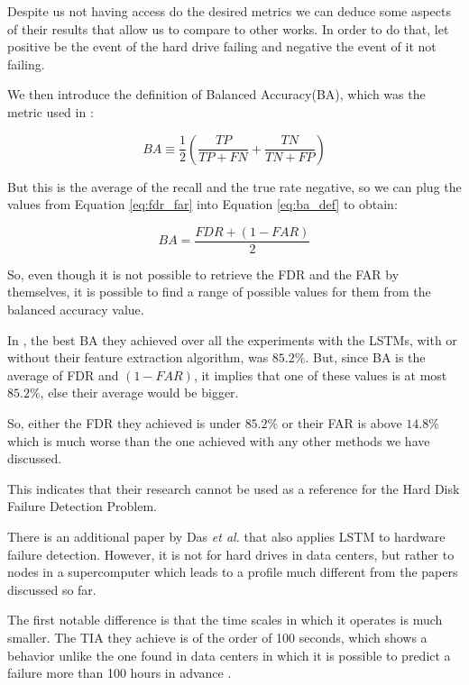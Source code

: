 Despite us not having access do the desired metrics we can deduce some aspects of their results that allow us to compare to other works.
In order to do that, let positive be the event of the hard drive failing and negative the event of it not failing.

We then introduce the definition of Balanced Accuracy(BA), which was the metric used in \cite{zhang2017deep}:

\begin{equation}\label{eq:ba_def}
    BA \equiv \dfrac{1}{2}\left(\dfrac{TP}{TP + FN} + \dfrac{TN}{TN + FP}\right)
\end{equation}

But this is the average of the recall and the true rate negative, so we can plug the values from Equation \ref{eq:fdr_far} into Equation \ref{eq:ba_def} to obtain:

\begin{equation}
    BA = \dfrac{FDR + (1-FAR)}{2}
\end{equation}

So, even though it is not possible to retrieve the FDR and the FAR by themselves, it is possible to find a range of possible values for them from the balanced accuracy value.

In \cite{zhang2017deep}, the best BA they achieved over all the experiments with the LSTMs, with or without their feature extraction algorithm, was $85.2\%$.
But, since BA is the average of FDR and $(1-FAR)$, it implies that one of these values is at most $85.2\%$, else their average would be bigger.

So, either the FDR they achieved is under $85.2\%$ or their FAR is above $14.8\%$ which is much worse than the one achieved with any other methods we have discussed.

This indicates that their research cannot be used as a reference for the Hard Disk Failure Detection Problem.

There is an additional paper by Das \textit{et al.} \cite{das2018desh} that also applies LSTM to hardware failure detection.
However, it is not for hard drives in data centers, but rather to nodes in a supercomputer which leads to a profile much different from the papers discussed so far.

The first notable difference is that the time scales in which it operates is much smaller.
The TIA they achieve is of the order of 100 seconds, which shows a behavior unlike the one found in data centers in which it is possible to predict a failure more than 100 hours in advance \cite{Li14} \cite{Zhu13}.

